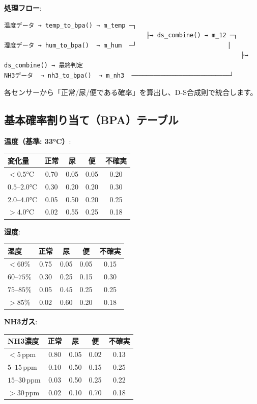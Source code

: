 \documentclass[a4paper,11pt]{article}
\begin{document}
\textbf{処理フロー}:

\begin{verbatim}
温度データ → temp_to_bpa() → m_temp ─┐
                                       ├→ ds_combine() → m_12 ─┐
湿度データ → hum_to_bpa()  → m_hum  ─┘                         │
                                                                 ├→ ds_combine() → 最終判定
NH3データ  → nh3_to_bpa()  → m_nh3  ───────────────────────────┘
\end{verbatim}

各センサーから「正常/尿/便である確率」を算出し、D-S合成則で統合します。

\subsection{基本確率割り当て（BPA）テーブル}

\textbf{温度（基準: 33°C）}:
\begin{center}
\begin{tabular}{lcccc}
\toprule
\textbf{変化量} & \textbf{正常} & \textbf{尿} & \textbf{便} & \textbf{不確実} \\
\midrule
$< 0.5$°C  & 0.70 & 0.05 & 0.05 & 0.20 \\
$0.5$--$2.0$°C & 0.30 & 0.20 & 0.20 & 0.30 \\
$2.0$--$4.0$°C & 0.05 & 0.50 & 0.20 & 0.25 \\
$> 4.0$°C  & 0.02 & 0.55 & 0.25 & 0.18 \\
\bottomrule
\end{tabular}
\end{center}

\textbf{湿度}:
\begin{center}
\begin{tabular}{lcccc}
\toprule
\textbf{湿度} & \textbf{正常} & \textbf{尿} & \textbf{便} & \textbf{不確実} \\
\midrule
$< 60\%$    & 0.75 & 0.05 & 0.05 & 0.15 \\
$60$--$75\%$  & 0.30 & 0.25 & 0.15 & 0.30 \\
$75$--$85\%$  & 0.05 & 0.45 & 0.25 & 0.25 \\
$> 85\%$    & 0.02 & 0.60 & 0.20 & 0.18 \\
\bottomrule
\end{tabular}
\end{center}

\textbf{NH3ガス}:
\begin{center}
\begin{tabular}{lcccc}
\toprule
\textbf{NH3濃度} & \textbf{正常} & \textbf{尿} & \textbf{便} & \textbf{不確実} \\
\midrule
$< 5$\,ppm    & 0.80 & 0.05 & 0.02 & 0.13 \\
$5$--$15$\,ppm  & 0.10 & 0.50 & 0.15 & 0.25 \\
$15$--$30$\,ppm & 0.03 & 0.50 & 0.25 & 0.22 \\
$> 30$\,ppm   & 0.02 & 0.10 & 0.70 & 0.18 \\
\bottomrule
\end{tabular}
\end{center}
\end{document}
